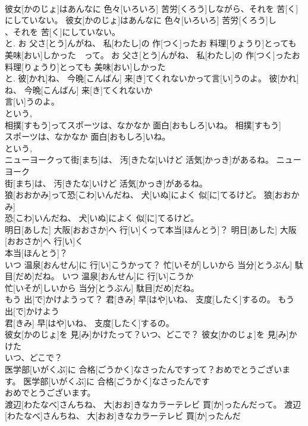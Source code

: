 \documentclass[8pt]{extreport}
\begin{document}
\begin{CJK}{UTF8}{min}
\\	彼女[かのじょ]はあんなに 色々[いろいろ] 苦労[くろう]しながら、それを 苦[く]にしていない。	彼女[かのじょ]はあんなに 色々[いろいろ] 苦労[くろう]し
\\	、それを 苦[く]にしていない。	
\\	と.	お 父さ[とう]んがね、 私[わたし]の 作[つく]ったお 料理[りょうり]とっても 美味[おい]しかった　って。	お 父さ[とう]んがね、 私[わたし]の 作[つく]ったお 料理[りょうり]とっても 美味[おい]しかった　
\\	と.	彼[かれ]ね、 今晩[こんばん] 来[き]てくれないかって言[い]うのよ。	彼[かれ]ね、 今晩[こんばん] 来[き]てくれないか
\\	言[い]うのよ。	
\\	という, 
\\	相撲[すもう]ってスポーツは、なかなか 面白[おもしろ]いね。	相撲[すもう]
\\	スポーツは、なかなか 面白[おもしろ]いね。	
\\	という, 
\\	ニューヨークって街[まち]は、 汚[きたな]いけど 活気[かっき]があるね。	ニューヨーク
\\	街[まち]は、 汚[きたな]いけど 活気[かっき]があるね。	
\\	狼[おおかみ]って恐[こわ]いんだね、 犬[いぬ]によく 似[に]てるけど。	狼[おおかみ]
\\	恐[こわ]いんだね、 犬[いぬ]によく 似[に]てるけど。	
\\	明日[あした] 大阪[おおさか]へ 行[い]くって本当[ほんとう]？	明日[あした] 大阪[おおさか]へ 行[い]く
\\	本当[ほんとう]？	
\\	いつ 温泉[おんせん]に 行[い]こうかって？ 忙[いそが]しいから 当分[とうぶん] 駄目[だめ]だね。	いつ 温泉[おんせん]に 行[い]こうか
\\	忙[いそが]しいから 当分[とうぶん] 駄目[だめ]だね。	
\\	もう 出[で]かけようって？ 君[きみ] 早[はや]いね、 支度[したく]するの。	もう 出[で]かけよう
\\	君[きみ] 早[はや]いね、 支度[したく]するの。	
\\	彼女[かのじょ]を 見[み]かけたって？いつ、どこで？	彼女[かのじょ]を 見[み]かけた
\\	いつ、どこで？	
\\	医学部[いがくぶ]に 合格[ごうかく]なさったんですって？おめでとうございます。	医学部[いがくぶ]に 合格[ごうかく]なさったんです
\\	おめでとうございます。	
\\	渡辺[わたなべ]さんちね、 大[おお]きなカラーテレビ 買[か]ったんだって。	渡辺[わたなべ]さんちね、 大[おお]きなカラーテレビ 買[か]ったんだ

\end{CJK}
\end{document}
